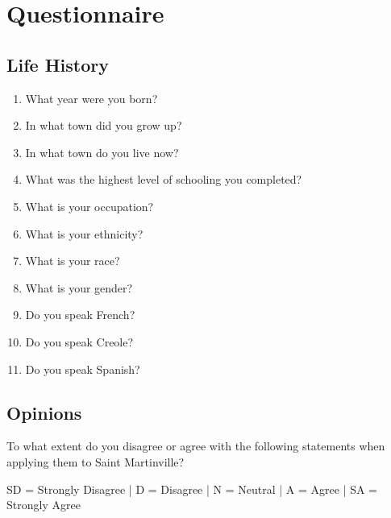 

\section{Questionnaire}
  \subsection{Life History}
    \begin{enumerate}
      \item What year were you born? \hrulefill
      \item In what town did you grow up? \hrulefill
      \item In what town do you live now? \hrulefill
      \item What was the highest level of schooling you completed? \hrulefill
      \item What is your occupation? \hrulefill
      \item What is your ethnicity? \hrulefill
      \item What is your race? \hrulefill
      \item What is your gender? \hrulefill
      \item Do you speak French? \hrulefill
      \item Do you speak Creole? \hrulefill
      \item Do you speak Spanish? \hrulefill
    \end{enumerate}

  \subsection{Opinions}
    \noindent To what extent do you disagree or agree with the following statements when applying them to Saint Martinville?

    {\scriptsize
        \noindent SD = Strongly Disagree | D = Disagree | N = Neutral | A = Agree | SA = Strongly Agree
    }

